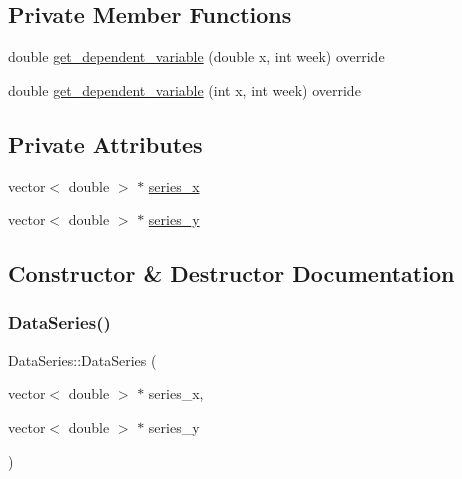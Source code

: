 \subsection*{Private Member Functions}
\begin{DoxyCompactItemize}
\item 
double \mbox{\hyperlink{classDataSeries_a1242b9fdbdbb4e91a0e8b9e2383085d8_a1242b9fdbdbb4e91a0e8b9e2383085d8}{get\+\_\+dependent\+\_\+variable}} (double x, int week) override
\item 
double \mbox{\hyperlink{classDataSeries_a16a0aab69c764944dbb4a55b7432f37b_a16a0aab69c764944dbb4a55b7432f37b}{get\+\_\+dependent\+\_\+variable}} (int x, int week) override
\end{DoxyCompactItemize}
\subsection*{Private Attributes}
\begin{DoxyCompactItemize}
\item 
vector$<$ double $>$ $\ast$ \mbox{\hyperlink{classDataSeries_ac49042cab004e46a8183cc10183fbfcd_ac49042cab004e46a8183cc10183fbfcd}{series\+\_\+x}}
\item 
vector$<$ double $>$ $\ast$ \mbox{\hyperlink{classDataSeries_a4a8cff07f177a4787904ed1cd746bf23_a4a8cff07f177a4787904ed1cd746bf23}{series\+\_\+y}}
\end{DoxyCompactItemize}


\subsection{Constructor \& Destructor Documentation}
\mbox{\label{classDataSeries_a8af4ff388a574c8b836c2880492a8423_a8af4ff388a574c8b836c2880492a8423}} 
\subsubsection{\texorpdfstring{Data\+Series()}{DataSeries()}}
{\footnotesize\ttfamily Data\+Series\+::\+Data\+Series (\begin{DoxyParamCaption}\item[{vector$<$ double $>$ $\ast$}]{series\+\_\+x,  }\item[{vector$<$ double $>$ $\ast$}]{series\+\_\+y }\end{DoxyParamCaption})}

